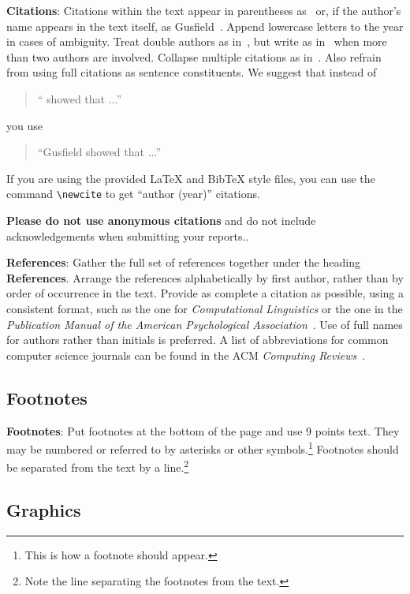 \documentclass[11pt]{article}
\begin{document}
{\bf Citations}: Citations within the text appear in parentheses
as~\cite{Gusfield:97} or, if the author's name appears in the text
itself, as Gusfield~.  Append lowercase letters
to the year in cases of ambiguity.  Treat double authors as
in~\cite{Aho:72}, but write as in~\cite{Chandra:81} when more than two
authors are involved. Collapse multiple citations as
in~\cite{Gusfield:97,Aho:72}. Also refrain from using full citations
as sentence constituents. We suggest that instead of
\begin{quote}
  ``\cite{Gusfield:97} showed that ...''
\end{quote}
you use
\begin{quote}
``Gusfield    showed that ...''
\end{quote}

If you are using the provided \LaTeX{} and Bib\TeX{} style files, you
can use the command \verb|\newcite| to get ``author (year)'' citations.

\textbf{Please do not use anonymous citations} and do not include
acknowledgements when submitting your reports..

\textbf{References}: Gather the full set of references together under
the heading {\bf References}. Arrange the references alphabetically
by first author, rather than by order of occurrence in the text.
Provide as complete a citation as possible, using a consistent format,
such as the one for {\em Computational Linguistics\/} or the one in the 
{\em Publication Manual of the American 
Psychological Association\/}~\cite{APA:83}.  Use of full names for
authors rather than initials is preferred.  A list of abbreviations
for common computer science journals can be found in the ACM 
{\em Computing Reviews\/}~\cite{ACM:83}.

\subsection{Footnotes}

{\bf Footnotes}: Put footnotes at the bottom of the page and use 9
points text. They may be numbered or referred to by asterisks or other
symbols.\footnote{This is how a footnote should appear.} Footnotes
should be separated from the text by a line.\footnote{Note the line
separating the footnotes from the text.}

\subsection{Graphics}
\end{document}
